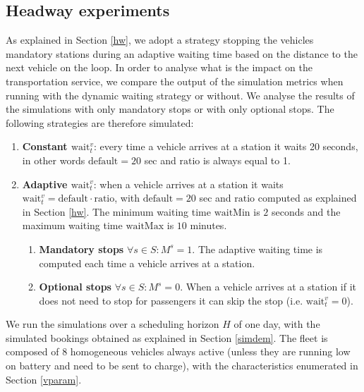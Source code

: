 \documentclass[12pt,a4paper]{article}
\begin{document}
\subsection{Headway experiments}\label{hwexperiments}
As explained in Section \ref{hw}, we adopt a strategy stopping the vehicles mandatory stations during an adaptive waiting time based on the distance to the next vehicle on the loop. In order to analyse what is the impact on the transportation service, we compare the output of the simulation metrics when running with the dynamic waiting strategy or without. We analyse the results of the simulations with only mandatory stops or with only optional stops. The following strategies are therefore simulated:
\begin{enumerate}
\setlength\itemsep{1pt}
\item \textbf{Constant $\text{wait}_t^{v}$}: every time a vehicle arrives at a station it waits 20 seconds, in other words $\text{default}= 20$ sec and $\text{ratio}$ is always equal to 1. 
\item \textbf{Adaptive $\text{wait}_t^{v}$}: when a vehicle arrives at a station it waits $\text{wait}_t^{v} = \text{default} \cdot \text{ratio}$, with $\text{default} = 20$ sec and $\text{ratio}$ computed as explained in Section \ref{hw}. The minimum waiting time $\text{waitMin}$ is $2$ seconds and the maximum waiting time $\text{waitMax}$ is $10$ minutes.
\begin{enumerate}
\item \textbf{Mandatory stops} $\forall s \in S: M^{s} = 1$. The adaptive waiting time is computed each time a vehicle arrives at a station.
\item \textbf{Optional stops} $\forall s \in S: M^{s} = 0$. When a vehicle arrives at a station if it does not need to stop for passengers it can skip the stop (i.e. $\text{wait}_{t}^{v} = 0$).
\end{enumerate}
\end{enumerate}
We run the simulations over a scheduling horizon $H$ of one day, with the simulated bookings obtained as explained in Section \ref{simdem}. The fleet is composed of 8 homogeneous vehicles always active (unless they are running low on battery and need to be sent to charge), with the characteristics enumerated in Section \ref{vparam}. 
\end{document}
